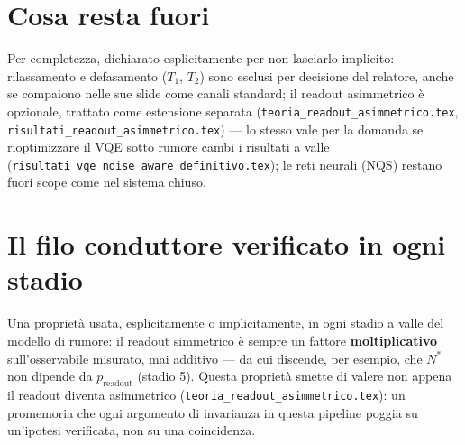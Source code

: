 \documentclass[11pt,a4paper]{article}
\begin{document}
\section{Cosa resta fuori}

Per completezza, dichiarato esplicitamente per non lasciarlo implicito:
rilassamento e defasamento ($T_1$, $T_2$) sono esclusi per decisione
del relatore, anche se compaiono nelle sue slide come canali standard;
il readout asimmetrico è opzionale, trattato come estensione separata
(\texttt{teoria\_readout\_asimmetrico.tex},
\texttt{risultati\_readout\_asimmetrico.tex}) --- lo stesso vale per la
domanda se rioptimizzare il VQE sotto rumore cambi i risultati a valle
(\texttt{risultati\_vqe\_noise\_aware\_definitivo.tex}); le reti neurali
(NQS) restano fuori scope come nel sistema chiuso.

\section{Il filo conduttore verificato in ogni stadio}

Una proprietà usata, esplicitamente o implicitamente, in ogni stadio a
valle del modello di rumore: il readout simmetrico è sempre un fattore
\textbf{moltiplicativo} sull'osservabile misurato, mai additivo --- da
cui discende, per esempio, che $N^*$ non dipende da $p_\text{readout}$
(stadio 5). Questa proprietà smette di valere non appena il readout
diventa asimmetrico (\texttt{teoria\_readout\_\allowbreak asimmetrico.tex}): un
promemoria che ogni argomento di invarianza in questa pipeline poggia su
un'ipotesi verificata, non su una coincidenza.
\end{document}

